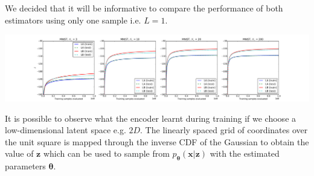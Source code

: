 \documentclass[landscape,a0b,final,a4resizeable]{include/a0poster}
\begin{document}
\begin{poster}
\begin{multicols}{3}
We decided that it will be informative to compare the performance of both estimators using only one sample i.e. $L=1$.

\vspace{0.5em}

\begin{center}
\includegraphics[width=1\columnwidth]{../res/mnist_LAvsLB}
\end{center}

\vspace{0.5em}


It is possible to observe what the encoder learnt during training if we choose a low-dimensional latent space e.g. $2D$. The linearly spaced grid of coordinates over the unit square is mapped through the inverse CDF of the Gaussian to obtain the value of $\mathbf{z}$ which can be used to sample from $p_{\mathbf{\theta}} (\mathbf{x}| \mathbf{z})$ with the estimated parameters $\boldsymbol{\theta}$.

\vspace{0.5em}


\end{multicols}
\end{poster}
\end{document}
